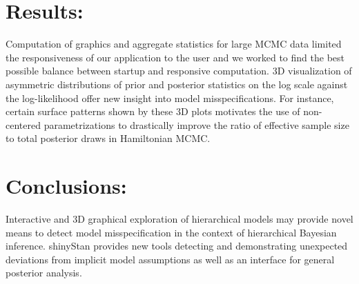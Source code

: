 \documentclass[11pt,notitlepage]{article}
\begin{document}
\section*{Results:}

Computation of graphics and aggregate statistics for large MCMC data limited the responsiveness of our application to the user and we worked to find the best possible balance between startup and responsive computation. 3D visualization of asymmetric distributions of prior and posterior statistics on the log scale against the log-likelihood offer new insight into model misspecifications. For instance, certain surface patterns shown by these 3D plots motivates the use of non-centered parametrizations to drastically improve the ratio of effective sample size to total posterior draws in Hamiltonian MCMC.
\section*{Conclusions:}

Interactive and 3D graphical exploration of hierarchical models may provide novel means to detect model misspecification in the context of hierarchical Bayesian inference. shinyStan provides new tools detecting and demonstrating unexpected deviations from implicit model assumptions as well as an interface for general posterior analysis.


\newpage


\end{document}
